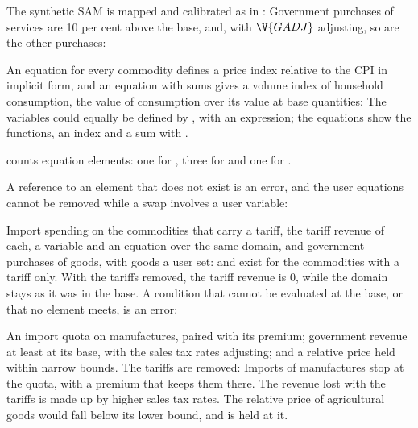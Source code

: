 
The synthetic SAM is mapped and calibrated as in :
Government purchases of services are 10 per cent above the base, and, with
$\V{GADJ}$ adjusting, so are the other purchases:


An equation for every commodity defines a price index relative to the CPI in
implicit form, and an equation with sums gives a volume index of household
consumption, the value of consumption over its value at base quantities:
The variables could equally be defined by , with an
expression; the equations show the functions, an index and a sum with
.


 counts equation elements: one for , three for
 and one for .


A reference to an element that does not exist is an error, and the user
equations cannot be removed while a swap involves a user variable:


Import spending on the commodities that carry a tariff, the tariff revenue of
each, a variable and an equation over the same domain, and government purchases
of goods, with goods a user set:
 and  exist for the commodities with a tariff only. With the
tariffs removed, the tariff revenue is 0, while the domain stays as it was in the
base. A condition that cannot be evaluated at the base, or that no element
meets, is an error:


An import quota on manufactures, paired with its premium; government revenue
at least at its base, with the sales tax rates adjusting; and a relative price
held within narrow bounds. The tariffs are removed:
Imports of manufactures stop at the quota, with a premium that keeps them
there. The revenue lost with the tariffs is made up by higher sales tax rates.
The relative price of agricultural goods would fall below its lower bound, and
is held at it.

